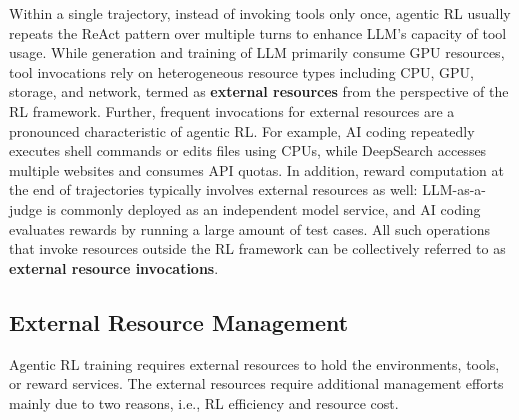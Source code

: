 Within a single trajectory, instead of invoking tools only once,  agentic RL usually repeats the ReAct pattern over multiple turns to enhance LLM's capacity of tool usage. 
While generation and training of LLM primarily consume GPU resources, tool invocations rely on heterogeneous resource types including CPU, GPU, storage, and network, termed as \textbf{external resources}  from the perspective of the RL framework.
Further, frequent invocations for external resources are a pronounced characteristic of agentic RL.
For example, AI coding repeatedly executes shell commands or edits files using CPUs, while DeepSearch accesses multiple websites and consumes API quotas.
In addition, reward computation at the end of trajectories typically involves external resources as well: LLM-as-a-judge is commonly deployed as an independent model service, and AI coding evaluates rewards by running a large amount of test cases.
All such operations that invoke resources outside the RL framework can be collectively referred to as \textbf{external resource invocations}. 




\subsection{External Resource Management}
\label{sec:background_resource}

Agentic RL training requires external resources to hold the environments, tools, or reward services.
The external resources require additional management efforts mainly due to two reasons, i.e., RL efficiency and resource cost.

